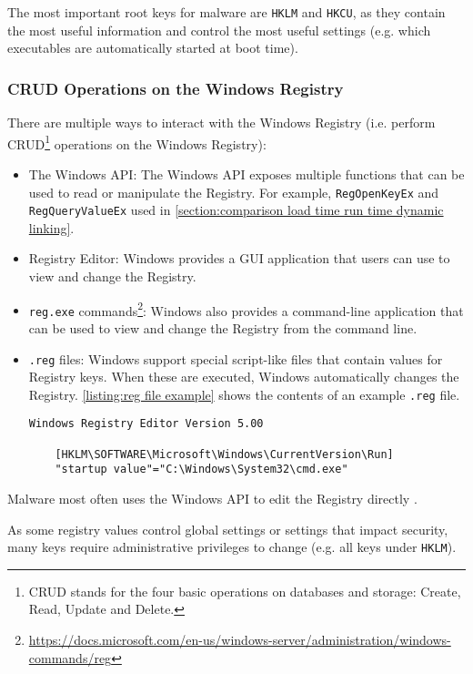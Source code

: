 The most important root keys for malware are \texttt{HKLM} and \texttt{HKCU}, as they contain the most useful information and control the most useful settings (e.g. which executables are automatically started at boot time).

\subsubsection{CRUD Operations on the Windows Registry}
There are multiple ways to interact with the Windows Registry (i.e. perform CRUD\footnote{CRUD stands for the four basic operations on databases and storage: Create, Read, Update and Delete.} operations on the Windows Registry):
\begin{itemize}
    \item The Windows API: The Windows API exposes multiple functions that can be used to read or manipulate the Registry. For example, \texttt{RegOpenKeyEx} and \texttt{RegQueryValueEx} used in \autoref{section:comparison load time run time dynamic linking}.

    \item Registry Editor: Windows provides a GUI application that users can use to view and change the Registry.

    \item \texttt{reg.exe} commands\footnote{\tiny \url{https://docs.microsoft.com/en-us/windows-server/administration/windows-commands/reg}}: Windows also provides a command-line application that can be used to view and change the Registry from the command line.

    \item \texttt{.reg} files: Windows support special script-like files that contain values for Registry keys. When these are executed, Windows automatically changes the Registry. \autoref{listing:reg file example} shows the contents of an example \texttt{.reg} file.

    \begin{lstlisting}[caption={An example \texttt{.reg} file.}, captionpos=b, label={listing:reg file example}]
    Windows Registry Editor Version 5.00

    [HKLM\SOFTWARE\Microsoft\Windows\CurrentVersion\Run]
    "startup value"="C:\Windows\System32\cmd.exe"
    \end{lstlisting}
\end{itemize}

Malware most often uses the Windows API to edit the Registry directly \cite{practical-malware-analysis}.

As some registry values control global settings or settings that impact security, many keys require administrative privileges to change (e.g. all keys under \texttt{HKLM}).
